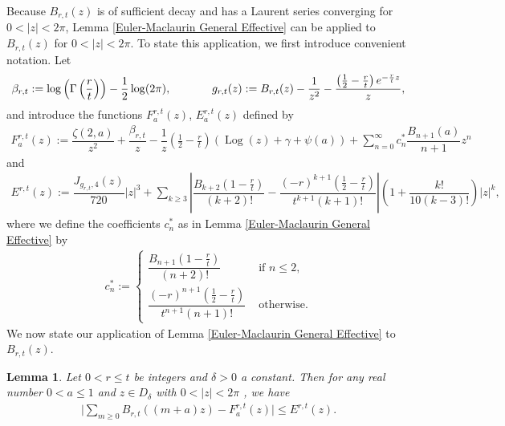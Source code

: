 \documentclass[11pt,reqno]{amsart}
\theoremstyle{definition}
\theoremstyle{plain}
\newtheorem{lemma}[theorem]{Lemma}
\theoremstyle{named}
\DeclareMathOperator\Log{Log}
\numberwithin{equation}{section}
\theoremstyle{example}
\def\lp{\left(}
\def\rp{\right)}
\begin{document}
Because $B_{r,t}(z)$ is of sufficient decay and has a Laurent series converging for $0 < |z| < 2\pi$, Lemma \ref{Euler-Maclaurin General Effective} can be applied to $B_{r,t}(z)$ for $0 < |z| < 2\pi$. To state this application, we first introduce convenient notation. Let
\begin{align*}
    \beta_{r,t} := \log\left(\Gamma\left(\frac rt\right) \right) - \frac 12\log(2\pi), \hspace{0.5in} g_{r,t}(z) := B_{r,t}(z) - \frac{1}{z^2} - \frac{\lp \frac 12 - \frac rt \rp e^{-\frac rt z}}{z},
\end{align*}
and introduce the functions $F_a^{r,t}(z)$, $E_a^{r,t}(z)$ defined by
\begin{align} \label{B_rt Approx Def}
    F_a^{r,t}(z) := \dfrac{\zeta(2,a)}{z^2} + \dfrac{\beta_{r,t}}{z} - \dfrac{1}{z} \lp \frac 12 - \frac rt \rp \lp \Log(z) + \gamma + \psi(a) \rp + \sum_{n = 0}^\infty c_n^* \dfrac{B_{n+1}(a)}{n+1} z^n
\end{align}
and
\begin{align} \label{B_rt Error Def}
    E^{r,t}(z) := \dfrac{J_{g_{r,t},4}(z)}{720} |z|^3 + \sum_{k \geq 3} \left| \dfrac{B_{k+2}\lp 1 - \frac rt \rp}{(k+2)!} - \dfrac{\lp -r \rp^{k+1} \lp \frac 12 - \frac rt \rp}{t^{k+1} (k+1)!} \right| \lp 1 + \dfrac{k!}{10(k-3)!} \rp |z|^k,
\end{align}
where we define the coefficients $c_n^*$ as in Lemma \ref{Euler-Maclaurin General Effective} by
\begin{align*}
    c_n^* := \begin{cases} \dfrac{B_{n+1}\lp 1 - \frac rt \rp}{(n+2)!} & \text{ if } n \leq 2, \\ \dfrac{(-r)^{n+1} \lp \frac 12 - \frac rt \rp}{t^{n+1} (n+1)!} & \text{ otherwise}. \end{cases}
\end{align*}
We now state our application of Lemma \ref{Euler-Maclaurin General Effective} to $B_{r,t}(z)$.

\begin{lemma} \label{B_rt Bound}
Let $0 < r \leq t$ be integers and $\delta > 0$ a constant. Then for any real number $0 < a \leq 1$ and $z \in D_\delta$ with $0 < |z| < 2\pi$ , we have
\begin{align*}
    \bigg| \sum_{m \geq 0} B_{r,t}\lp (m+a)z \rp - F_a^{r,t}(z) \bigg| \leq E^{r,t}(z).
\end{align*}
\end{lemma}
\end{document}
